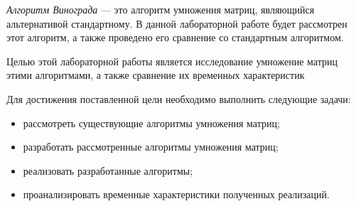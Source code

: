 
\emph{Алгоритм Винограда} --- это алгоритм умножения матриц, являющийся альтернативой стандартному. В данной лабораторной работе будет рассмотрен этот алгоритм, а также проведено его сравнение со стандартным алгоритмом.

Целью этой лабораторной работы является исследование умножение матриц этими алгоритмами, а также сравнение их временн\emph{ы}х характеристик

Для достижения поставленной цели необходимо выполнить следующие задачи:
\begin{itemize}
    \item рассмотреть существующие алгоритмы умножения матриц;
    \item разработать рассмотренные алгоритмы умножения матриц;
    \item реализовать разработанные алгоритмы;
    \item проанализировать временные характеристики полученных реализаций.
\end{itemize}

\clearpage
